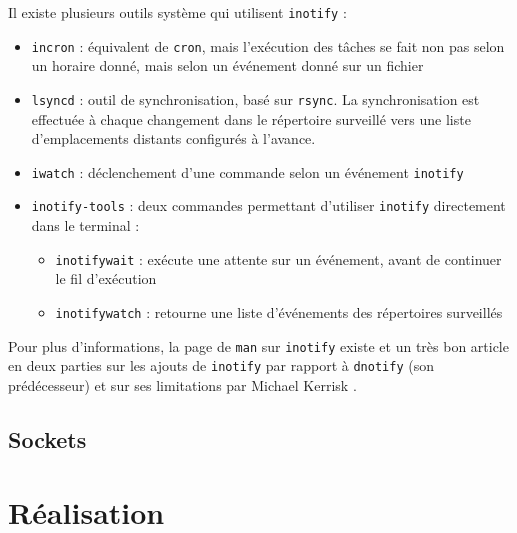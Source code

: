 \documentclass[a4paper, 12pt]{article}
\begin{document}
Il existe plusieurs outils système qui utilisent \texttt{inotify} \cite{ref30} :
\begin{itemize}
    \item \texttt{incron} : équivalent de \texttt{cron}, mais l'exécution 
        des tâches se fait non pas selon un horaire donné, mais selon un événement donné sur un fichier
    \item \texttt{lsyncd} : outil de synchronisation, basé sur \texttt{rsync}. 
        La synchronisation est effectuée à chaque changement dans le répertoire surveillé vers une 
        liste d'emplacements distants configurés à l'avance.
    \item \texttt{iwatch} : déclenchement d'une commande selon un événement \texttt{inotify}
    \item \texttt{inotify-tools} : deux commandes permettant d'utiliser \texttt{inotify} 
        directement dans le terminal :
        \begin{itemize}
            \item \texttt{inotifywait} : exécute une attente sur un événement, avant de 
                continuer le fil d'exécution
            \item \texttt{inotifywatch} : retourne une liste d'événements des répertoires surveillés
        \end{itemize}
\end{itemize}
Pour plus d'informations, la page de \texttt{man} sur \texttt{inotify} existe \cite{ref29} et 
un très bon article en deux parties sur les ajouts de \texttt{inotify} par rapport à \texttt{dnotify} 
(son prédécesseur) et sur ses limitations par Michael Kerrisk \cite{ref31} \cite{ref32}.

\subsection{Sockets}

\newpage


\section{Réalisation} %
\end{document}
